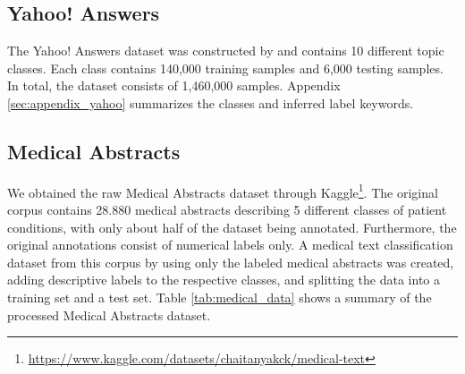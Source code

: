 \documentclass[sigconf]{acmart}
\begin{document}
\subsection{Yahoo! Answers}\label{sec:yahoo}
The Yahoo! Answers dataset was constructed by \citet{10.5555/2969239.2969312} and contains 10 different topic classes. Each class contains 140,000 training samples and 6,000 testing samples. In total, the dataset consists of 1,460,000 samples. Appendix \ref{sec:appendix_yahoo} summarizes the classes and inferred label keywords.

\subsection{Medical Abstracts}\label{sec:medical}
We obtained the raw Medical Abstracts dataset through Kaggle\footnote{\href{https://www.kaggle.com/datasets/chaitanyakck/medical-text}{https://www.kaggle.com/datasets/chaitanyakck/medical-text}}. The original corpus contains 28.880 medical abstracts describing 5 different classes of patient conditions, with only about half of the dataset being annotated. Furthermore, the original annotations consist of numerical labels only. A medical text classification dataset from this corpus by using only the labeled medical abstracts was created, adding descriptive labels to the respective classes, and splitting the data into a training set and a test set. Table \ref{tab:medical_data} shows a summary of the processed Medical Abstracts dataset.
\end{document}

